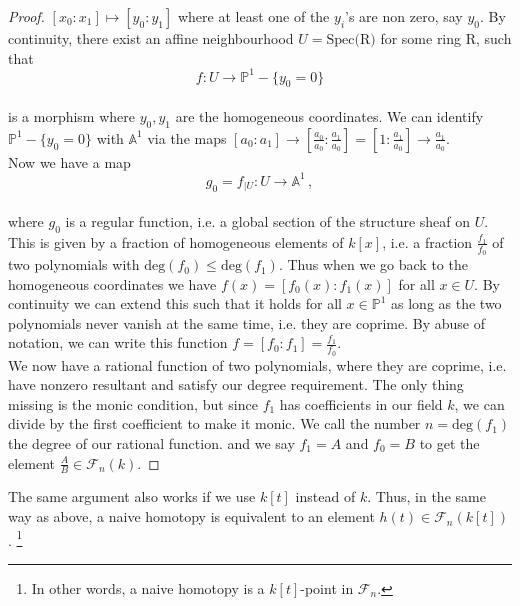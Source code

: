\begin{proposition}
\begin{proof}
\([x_0:x_1] \mapsto [y_0:y_1]\) where at least one of the \(y_i\)'s are non zero, say \(y_0\). By continuity, there exist an affine neighbourhood \(U=\text{Spec(R)}\) for some ring R, such that 
%
\begin{equation*}
    f: U \to \mathbb{P}^1 - \{y_0 = 0\}
\end{equation*} \\
%
is a morphism where \(y_0, y_1\) are the homogeneous coordinates. We can identify \(\mathbb{P}^1 - \{y_0 = 0\}\) with \(\mathbb{A}^1\) via the maps \([a_0:a_1] \to [\frac{a_0}{a_0}:\frac{a_1}{a_0}] = [1:\frac{a_1}{a_0}] \to \frac{a_1}{a_0}\). \\
Now we have a map 
%
\begin{equation*}
    g_0 = f_{|U} : U \longrightarrow \mathbb{A}^1 \,, 
\end{equation*} \\
%
where \(g_0\) is a regular function, i.e. a global section of the structure sheaf on \(U\). This is given by a fraction of homogeneous elements of \(k[x]\), i.e. a fraction \(\frac{f_1}{f_0}\) of two polynomials with \(\text{deg}(f_0) \leq \text{deg}(f_1)\). Thus when we go back to the homogeneous coordinates we have \(f(x) = [f_0(x):f_1(x)]\) for all \(x\in U\). By continuity we can extend this such that it holds for all \(x \in \mathbb{P}^1\) as long as the two polynomials never vanish at the same time, i.e. they are coprime. By abuse of notation, we can write this function \(f = [f_0:f_1] = \frac{f_1}{f_0}\). \\
We now have a rational function of two polynomials, where they are coprime, i.e. have nonzero resultant and satisfy our degree requirement. The only thing missing is the monic condition, but since \(f_1\) has coefficients in our field \(k\), we can divide by the first coefficient to make it monic. We call the number \(n = \text{deg}(f_1)\) the degree of our rational function. and we say \(f_1 = A\) and \(f_0 = B\) to get the element \(\frac{A}{B}\in \mathcal{F}_n(k)\). 
%
\end{proof}
%
\end{proposition}
%
\begin{remark}
The same argument also works if we use \(k[t]\) instead of \(k\). Thus, in the same way as above, a naive homotopy is equivalent to an element \(h(t) \in \mathcal{F}_n(k[t])\). \footnote{In other words, a naive homotopy is  a \(k[t]\)-point in \(\mathcal{F}_n\).}   
\end{remark}
